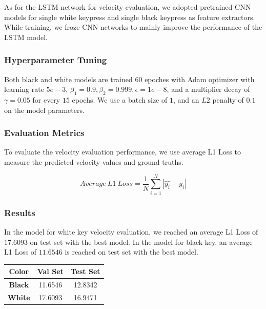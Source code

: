 \documentclass[10pt,twocolumn,letterpaper]{article}
\begin{document}
As for the LSTM network for velocity evaluation, we adopted pretrained CNN models for single white keypress and single black keypress as feature extractors. While training, we froze CNN networks to mainly improve the performance of the LSTM model.

\subsubsection{Hyperparameter Tuning}

Both black and white models are trained \(60\) epoches with Adam optimizer with learning rate \(5e-3\), \(\beta_1 = 0.9, \beta_2 = 0.999, \epsilon = 1e-8\), and a multiplier decay of \(\gamma=0.05\) for every $15$ epochs. We use a batch size of \(1\), and an \(L2\) penalty of \(0.1\) on the model parameters.

\subsubsection{Evaluation Metrics}

To evaluate the velocity evaluation performance, we use average L1 Loss to measure the predicted velocity values and ground truths.

\[Average\ L1\ Loss = \frac{1}{N}\sum_{i=1}^{N}|\widehat{y_i} - y_i|\]

\subsubsection{Results}

In the model for white key velocity evaluation, we reached an average L1 Loss of \(17.6093\) on test set with the best model. In the model for black key, an average L1 Loss of \(11.6546\) is reached on test set with the best model.\\

\begin{minipage}{\linewidth}
   \centering
\begin{tabular}{ccc}
   \toprule
   Color & Val Set & Test Set\\
   \midrule
   \textbf{Black} & 11.6546 & 12.8342\\
   \textbf{White} & 17.6093 & 16.9471\\
   \bottomrule
   \end{tabular}
    \label{tab:prevdataset}

\end{minipage}
\end{document}
